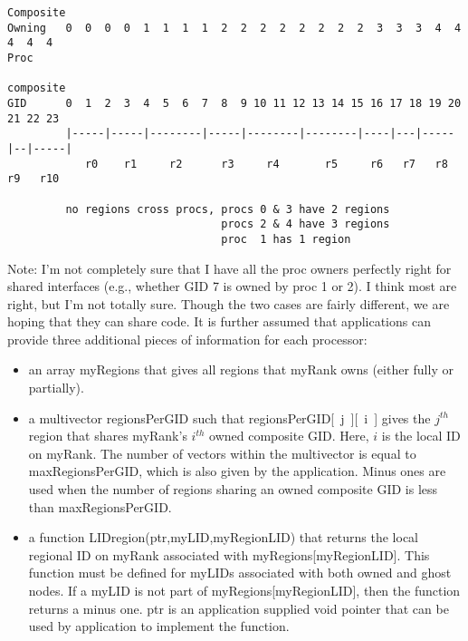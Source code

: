 \documentclass[11pt]{article}
\begin{document}
\begin{verbatim}
Composite
Owning   0  0  0  0  1  1  1  1  2  2  2  2  2  2  2  2  3  3  3  4  4  4  4  4
Proc

composite
GID      0  1  2  3  4  5  6  7  8  9 10 11 12 13 14 15 16 17 18 19 20 21 22 23
         |-----|-----|--------|-----|--------|--------|----|---|-----|--|-----|
            r0    r1     r2      r3     r4       r5     r6   r7   r8  r9   r10

         no regions cross procs, procs 0 & 3 have 2 regions
                                 procs 2 & 4 have 3 regions
                                 proc  1 has 1 region
\end{verbatim}
Note: I'm not completely sure that I have all the proc owners perfectly right for shared interfaces (e.g., whether GID 7 is owned by proc 1 or 2). I think most are right, but I'm not totally sure.
Though the two cases are fairly different, we are hoping that they can share code.  It is further assumed that applications can provide three additional pieces of information for each processor:
\begin{itemize}
\item an array {\sf myRegions} that gives all regions that {\sf myRank} owns (either fully or partially).
\item a multivector {\sf regionsPerGID} such that {\sf regionsPerGID[~j~][~i~]} gives the $j^{th}$ region that shares {\sf myRank}'s $i^{th}$ owned composite GID.  Here, $i$ is the local ID on {\sf myRank}.  The number of vectors within the multivector is equal to {\sf maxRegionsPerGID}, which is also given by the application. Minus ones are used when the number of regions sharing an owned
composite GID is less than {\sf maxRegionsPerGID}.
\item a function {\sf LIDregion(ptr,myLID,myRegionLID)} that returns the local regional ID on {\sf myRank} associated with {\sf myRegions[myRegionLID]}. This function must be defined for myLIDs associated with both owned and ghost nodes.
If a myLID is not part of {\sf myRegions[myRegionLID]}, then the function returns a minus one. {\sf ptr} is an application supplied void pointer that can be used by application to implement the function.
\end{itemize}
\end{document}
